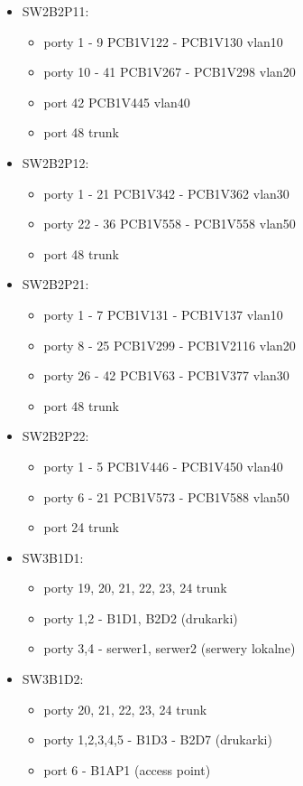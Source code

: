 \documentclass[a4paper, 12pt]{article}
\begin{document}
\begin{itemize}
\item SW2B2P11:
	\begin{itemize}
	\item porty 1 - 9 PCB1V122 - PCB1V130 vlan10
	\item porty 10 - 41 PCB1V267 - PCB1V298 vlan20
	\item port 42 PCB1V445 vlan40
	\item port 48 trunk
	\end{itemize}
	
\item SW2B2P12:
	\begin{itemize}
	\item porty 1 - 21 PCB1V342 - PCB1V362 vlan30
	\item porty 22 - 36 PCB1V558 - PCB1V558 vlan50
	\item port 48 trunk
	\end{itemize}
	
\item SW2B2P21:
	\begin{itemize}
	\item porty 1 - 7 PCB1V131 - PCB1V137 vlan10
	\item porty 8 - 25 PCB1V299 - PCB1V2116 vlan20
	\item porty 26 - 42 PCB1V63 - PCB1V377 vlan30
	\item port 48 trunk
	\end{itemize}
	
\item SW2B2P22:
	\begin{itemize}
	\item porty 1 - 5 PCB1V446 - PCB1V450 vlan40
	\item porty 6 - 21 PCB1V573 - PCB1V588 vlan50
	\item port 24 trunk
	\end{itemize}

\item SW3B1D1:
	\begin{itemize}
	\item porty 19, 20, 21, 22, 23, 24 trunk
	\item porty 1,2 - B1D1, B2D2 (drukarki)
	\item porty 3,4 - serwer1, serwer2 (serwery lokalne)
	\end{itemize}
	
\item SW3B1D2:
	\begin{itemize}
	\item porty 20, 21, 22, 23, 24 trunk
	\item porty 1,2,3,4,5 - B1D3 - B2D7 (drukarki)
	\item port 6 - B1AP1 (access point)
	\end{itemize}
	

\end{itemize}
\end{document}
